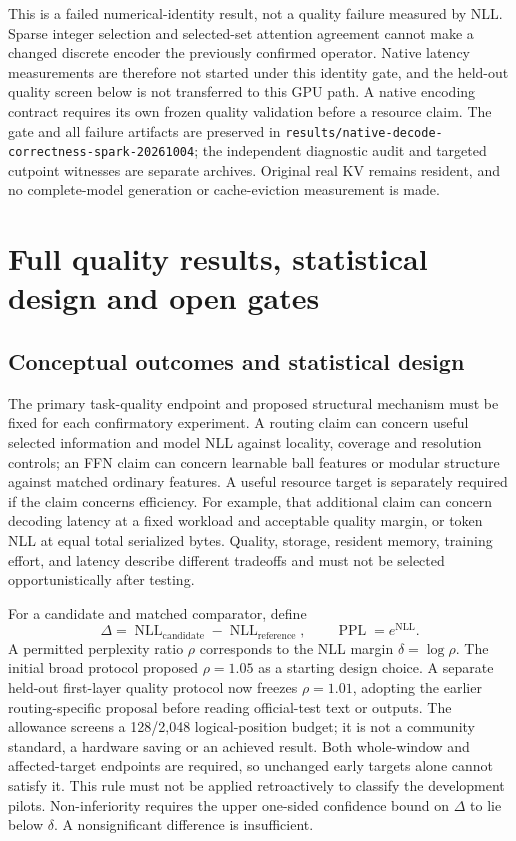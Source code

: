 \documentclass[11pt]{article}
\newcommand{\NLL}{\operatorname{NLL}}
\newcommand{\PPL}{\operatorname{PPL}}
\begin{document}
This is a failed numerical-identity result, not a quality failure measured
by NLL. Sparse integer selection and selected-set attention agreement cannot
make a changed discrete encoder the previously confirmed operator. Native
latency measurements are therefore not started under this identity gate,
and the held-out quality screen below is not transferred to this GPU path.
A native encoding contract requires its own frozen quality validation before
a resource claim. The gate and all failure artifacts are preserved in
\texttt{results/\allowbreak{}native-\allowbreak{}decode-\allowbreak{}correctness-\allowbreak{}spark-\allowbreak{}20261004};
the independent diagnostic audit and targeted cutpoint witnesses are separate
archives. Original real KV remains resident, and no complete-model generation
or cache-eviction measurement is made.


\section{Full quality results, statistical design and open gates}
\label{si:evaluation}

\subsection{Conceptual outcomes and statistical design}

The primary task-quality endpoint and proposed structural mechanism must be
fixed for each confirmatory experiment. A routing claim can concern useful
selected information and model NLL against locality, coverage and resolution
controls; an FFN claim can concern learnable ball features or modular
structure against matched ordinary features. A useful resource target is
separately required if the claim concerns efficiency. For example, that
additional claim can concern decoding latency at a fixed workload and
acceptable quality margin, or token NLL at equal total serialized bytes.
Quality, storage, resident memory, training effort, and latency describe
different tradeoffs and must not be selected opportunistically after testing.

For a candidate and matched comparator, define
\[
 \Delta=\NLL_{\mathrm{candidate}}-\NLL_{\mathrm{reference}},
 \qquad \PPL=e^{\NLL}.
\]
A permitted perplexity ratio \(\rho\) corresponds to the NLL margin
\(\delta=\log\rho\). The initial broad protocol proposed \(\rho=1.05\)
as a starting design choice. A separate held-out first-layer quality protocol
now freezes \(\rho=1.01\), adopting the earlier routing-specific proposal
before reading official-test text or outputs. The allowance screens a
128/2,048 logical-position budget; it is not a community standard, a hardware
saving or an achieved result. Both whole-window and affected-target endpoints
are required, so unchanged early targets alone cannot satisfy it. This rule
must not be applied retroactively to classify the development pilots.
Non-inferiority requires the upper one-sided confidence bound on \(\Delta\)
to lie below \(\delta\). A nonsignificant difference is insufficient.
\end{document}
